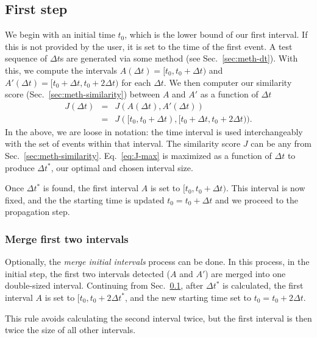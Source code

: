 \documentclass[draft]{article}
\begin{document}
\subsection{First step}
\label{sec:meth-firststep}
We begin with an initial time $t_0$, which is the lower bound of our
first interval.  If this is not provided by the user, it is set to the
time of the first event.  A test sequence of $\Delta t$s are generated
via some method (see Sec.~\ref{sec:meth-dt}).  With this, we compute
the intervals $ A(\Delta t) = [t_0, t_0+\Delta t)$ and $A'(\Delta t) =
[t_0+\Delta t, t_0+2\Delta t)$ for each $\Delta t$.  We then computer
our similarity score (Sec.~\ref{sec:meth-similarity}) between $A$ and
$A'$ as a function of $\Delta t$
\begin{eqnarray}
  J(\Delta t) &=& J(A(\Delta t), A'(\Delta t)) \nonumber \\
              &=& J([t_0, t_0+\Delta t),  [t_0+\Delta t, t_0+2\Delta t)).
              \label{eq:J-max}
\end{eqnarray}
In the above, we are loose in notation: the time interval is used
interchangeably with the set of events within that interval.  The
similarity score $J$ can be any from Sec.~\ref{sec:meth-similarity}.
Eq.~\ref{eq:J-max} is maximized as a function of $\Delta t$ to produce
$\Delta t^*$, our optimal and chosen interval size.

Once $\Delta t^*$ is found, the first interval $A$ is set to $[t_0,
t_0+\Delta t)$.  This interval is now fixed, and the the
starting time is updated $t_0 = t_0+\Delta t$ and we proceed to the
propagation step.

\subsubsection{Merge first two intervals}
\label{sec:meth-mergefirst}
Optionally, the \textit{merge initial intervals} process can be done.
In this process, in the initial step, the first two intervals detected
($A$ and $A'$) are merged into one double-sized interval.  Continuing
from Sec.~\ref{sec:meth-firststep}, after $\Delta t^*$ is calculated,
the first interval $A$ is set to $[t_0, t_0+2\Delta t^*$, and the new
starting time set to $t_0 = t_0 + 2\Delta t$.

This rule avoids calculating the second interval twice, but the first
interval is then twice the size of all other intervals.
\end{document}
